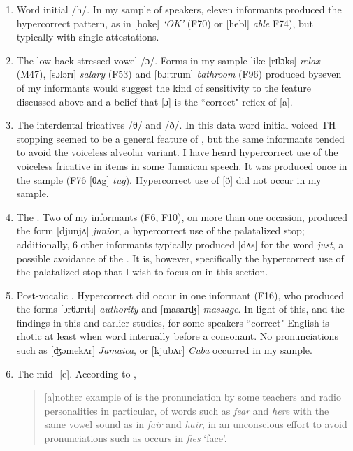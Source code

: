 \begin{enumerate}
\item  Word initial  /h/.  In my sample of speakers, eleven informants produced the hypercorrect pattern, as in [hoke] \textit{‘OK’} (F70) or [hebl] \textit{able} F74), but typically with single attestations.    

\item  The low back stressed vowel /ɔ/.  Forms in my sample like [rɪlɔks] \textit{relax} (M47), [sɔlǝrɪ] \textit{salary} (F53) and [bɔ:trum] \textit{bathroom} (F96) produced by\linebreak seven of my informants would suggest the kind of sensitivity to the feature discussed above and a belief that [ɔ] is the ``correct" reflex of [a].  

\item  The interdental fricatives /θ/ and /ð/.  In this data word initial voiced TH stopping seemed to be a general feature of , but the same informants tended to avoid the voiceless alveolar variant.  I have heard hypercorrect use of the voiceless fricative in items in some Jamaican speech.  It was produced once in the  sample (F76 [θʌg] \textit{tug}).  Hypercorrect use of [ð] did not occur in my sample.

\item  The .  Two of my informants (F6, F10), on more than one occasion, produced the form [djunjʌ] \textit{junior}, a hypercorrect use of the palatalized stop; additionally, 6 other informants typically produced [dʌs] for the word \textit{just}, a possible avoidance of the .  It is, however, specifically the hypercorrect use of the palatalized stop that I wish to focus on in this section. 

\item  Post-vocalic .   Hypercorrect  did occur in one informant (F16), who produced the forms [ɔrθɔrɪtɪ] \textit{authority} and [masarʤ] \textit{massage}.  In light of this, and the findings in this and earlier studies, for some  speakers ``correct" English is rhotic at least when word internally before a consonant.  No pronunciations such as [ʤǝmekʌr] \textit{Jamaica}, or [kjubʌr] \textit{Cuba} occurred in my sample.  

\item  The mid- [e].   According to \citet[19]{Christie2003},
\begin{quote}[a]nother example of  is the pronunciation by some teachers and radio personalities in particular, of words such as \textit{fear} and \textit{here} with the same vowel sound as in \textit{fair} and \textit{hair}, in an unconscious effort to avoid  pronunciations such as occurs in \textit{fies} `face'.\end{quote}
\end{enumerate}

